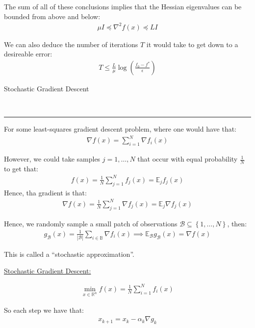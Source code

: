 \documentclass{article}
\newcommand{\header}[1]{\begin{large}\noindent #1\end{large}\\\rule{\textwidth}{0.5pt}}
\newcommand{\sheader}[1]{\underline{#1:}}
\newcommand{\curly}[1]{\left\{#1\right\}}
\begin{document}
The sum of all of these conclusions implies that the Hessian eigenvalues 
can be bounded from above and below:
\begin{align*}
    \mu I \preceq \nabla^2 f(x) \preceq LI
\end{align*}

We can also deduce the number of iterations $T$ it would take 
to get down to a desireable error:
\begin{align*}
    T \leq \frac{L}{\mu}\log\left(\frac{f_0 - f^*}{\epsilon}\right)
\end{align*}

\header{Stochastic Gradient Descent}

For some least-squares gradient descent problem, where one would have that:
\begin{align*}
    \nabla f(x) = \sum_{i=1}^{N}\nabla f_i(x)
\end{align*}

However, we could take samples $j = 1, \ldots, N$ that occur with 
equal probability $\frac{1}{N}$ to get that:
\begin{align*}
    f(x) = \frac{1}{N}\sum_{j=1}^{N}f_j(x)= \mathbb{E}_j f_j(x)
\end{align*}
Hence, tha gradient is that:
\begin{align*}
    \nabla f(x) = \frac{1}{N}\sum_{j=1}^{N}\nabla f_j(x) = \mathbb{E}_j \nabla f_j(x)
\end{align*}

Hence, we randomly sample a small patch of observations $\mathcal{B} \subseteq \curly{1, \ldots, N}$,
then:
\begin{align*}
    g_\mathcal{B}(x) = \frac{1}{|\mathcal{B}|}\sum_{i\in \mathbb{B}}\nabla f_i(x) \implies \mathbb{E}_\mathcal{B}g_\mathcal{B}(x) = \nabla f(x)
\end{align*}

This is called a ``stochastic approximation''.

\pagebreak

\sheader{Stochastic Gradient Descent}

\begin{align*}
    \min_{x\in \mathbb{R}^n} f(x) = \frac{1}{N}\sum_{i=1}^{N}f_i(x)
\end{align*}

So each step we have that:
\begin{align*}
    x_{k+1} = x_k - \alpha_k \nabla g_k
\end{align*}
\end{document}
